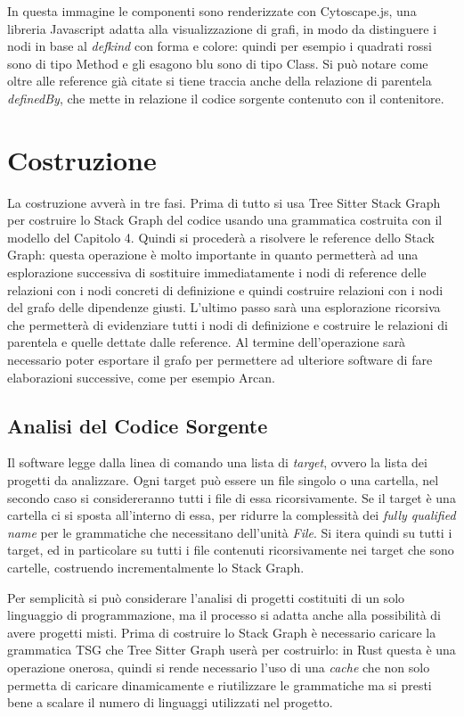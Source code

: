 In questa immagine le componenti sono renderizzate con Cytoscape.js, una libreria Javascript adatta alla visualizzazione di grafi, in modo da distinguere i nodi in base al \emph{defkind} con forma e colore: quindi per esempio i quadrati rossi sono di tipo Method e gli esagono blu sono di tipo Class.
Si pu\`o notare come oltre alle reference gi\`a citate si tiene traccia anche della relazione di parentela \emph{definedBy}, che mette in relazione il codice sorgente contenuto con il contenitore.

\section{Costruzione}

La costruzione avver\`a in tre fasi.
Prima di tutto si usa Tree Sitter Stack Graph per costruire lo Stack Graph del codice usando una grammatica costruita con il modello del Capitolo 4.
Quindi si proceder\`a a risolvere le reference dello Stack Graph: questa operazione \`e molto importante in quanto permetter\`a ad una esplorazione successiva di sostituire immediatamente i nodi di reference delle relazioni con i nodi concreti di definizione e quindi costruire relazioni con i nodi del grafo delle dipendenze giusti.
L'ultimo passo sar\`a una esplorazione ricorsiva che permetter\`a di evidenziare tutti i nodi di definizione e costruire le relazioni di parentela e quelle dettate dalle reference.
Al termine dell'operazione sar\`a necessario poter esportare il grafo per permettere ad ulteriore software di fare elaborazioni successive, come per esempio Arcan.

\subsection{Analisi del Codice Sorgente}

Il software legge dalla linea di comando una lista di \emph{target}, ovvero la lista dei progetti da analizzare.
Ogni target pu\`o essere un file singolo o una cartella, nel secondo caso si considereranno tutti i file di essa ricorsivamente. Se il target \`e una cartella ci si sposta all'interno di essa, per ridurre la complessit\`a dei \emph{fully qualified name} per le grammatiche che necessitano dell'unit\`a \emph{File}.
Si itera quindi su tutti i target, ed in particolare su tutti i file contenuti ricorsivamente nei target che sono cartelle, costruendo incrementalmente lo Stack Graph.

Per semplicit\`a si pu\`o considerare l'analisi di progetti costituiti di un solo linguaggio di programmazione, ma il processo si adatta anche alla possibilit\`a di avere progetti misti. Prima di costruire lo Stack Graph \`e necessario caricare la grammatica TSG che Tree Sitter Graph user\`a per costruirlo: in Rust questa \`e una operazione onerosa, quindi si rende necessario l'uso di una \emph{cache} che non solo permetta di caricare dinamicamente e riutilizzare le grammatiche ma si presti bene a scalare il numero di linguaggi utilizzati nel progetto.

